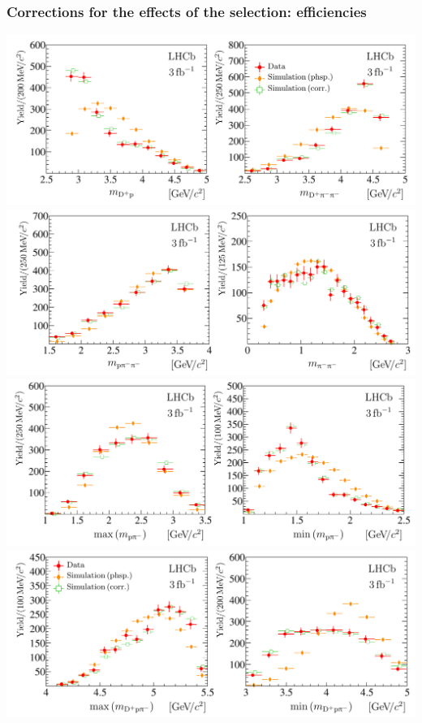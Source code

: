 \documentclass[10pt, aspectratio=169]{beamer}
\begin{document}
\begin{frame}[label=efficiencies]%
  \frametitle{Corrections for the effects of the selection: efficiencies}

  \centering
  \includegraphics[width=.45\linewidth]{figures/conf/Lb2Dppipi-fig005-1}
  \includegraphics[width=.45\linewidth]{figures/conf/Lb2Dppipi-fig005-2}
  \includegraphics[width=.45\linewidth]{figures/conf/Lb2Dppipi-fig005-3}
  \includegraphics[width=.45\linewidth]{figures/conf/Lb2Dppipi-fig006-1}

\end{frame}%
\end{document}
